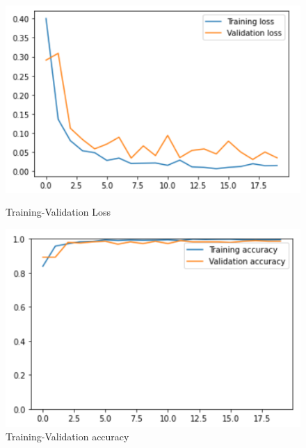 \documentclass[11pt,a4paper]{article}
\theoremstyle{definition}
\begin{document}
\begin{figure}[H]
  \centering
  \begin{minipage}[b]{0.45\textwidth}
    \includegraphics[scale=0.75]{./images/xception2aloss}
	\caption{Training-Validation Loss}
  \end{minipage}
  \hfill
  \begin{minipage}[b]{0.45\textwidth}
    \includegraphics[scale=0.75]{./images/xception2acc}
	\caption{Training-Validation accuracy}
  \end{minipage}
\end{figure}
\end{document}
